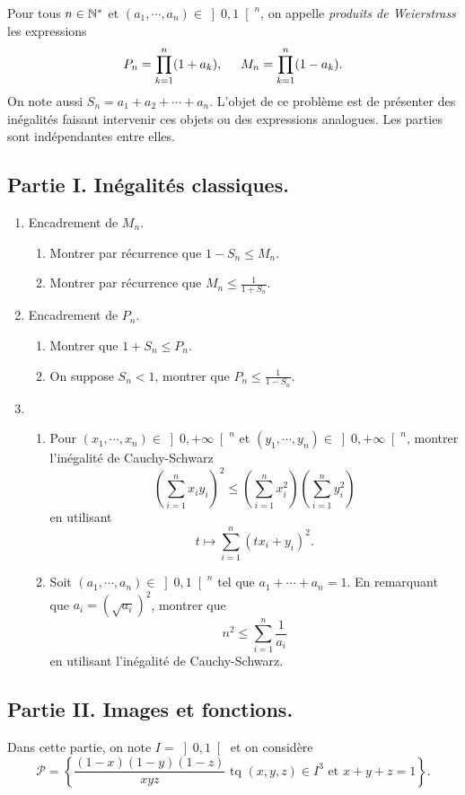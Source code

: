 Pour tous $n \in \mathbb{N}^*$ et $(a_1,\cdots,a_n)\in \left] 0, 1\right[^n$, on appelle \emph{produits de Weierstrass} les expressions 
\[
 P_n = \prod_{k=1}^{n}(1 + a_k), \hspace{0.5cm} M_n = \prod_{k=1}^{n}(1 - a_k). 
\]
On note aussi $S_n = a_1 + a_2 + \cdots + a_n$. \newline
L'objet de ce problème est de présenter des inégalités faisant intervenir ces objets ou des expressions analogues. Les parties sont indépendantes entre elles.
\subsection*{Partie I. Inégalités classiques.}
\begin{enumerate}
\item Encadrement de $M_n$.
\begin{enumerate}
 \item Montrer par récurrence que $1 - S_n \leq M_n$.
 \item Montrer par récurrence que $M_n \leq \frac{1}{1 + S_n}$.
\end{enumerate}
\item Encadrement de $P_n$.
\begin{enumerate}
 \item Montrer que $1 + S_n \leq P_n$.
 \item On suppose $S_n < 1$, montrer que $P_n \leq \frac{1}{1 - S_n}$.
\end{enumerate}
\item 
\begin{enumerate}
 \item Pour $(x_1,\cdots,x_n)\in \left]0, + \infty\right[^n$ et $(y_1,\cdots,y_n)\in \left]0, + \infty\right[^n$, montrer l'inégalité de Cauchy-Schwarz
\[
 \left( \sum_{i=1}^n x_i y_i\right)^2 \leq \left( \sum_{i=1}^n x_i^2\right)  \left( \sum_{i=1}^n y_i^2\right)
\]
en utilisant 
\[
 t \mapsto \sum_{i=1}^n (t x_i + y_i)^2.
\]
 \item Soit $(a_1,\cdots,a_n)\in \left] 0, 1\right[^n$ tel que $a_1+\cdots + a_n=1$. En remarquant que $a_i = (\sqrt{a_i})^2$, montrer que 
\[
 n^2 \leq \sum_{i=1}^n \frac{1}{a_i}
\]
en utilisant l'inégalité de Cauchy-Schwarz.
\end{enumerate}


\end{enumerate}

\subsection*{Partie II. Images et fonctions.}
Dans cette partie, on note $I = \left] 0,1 \right[$ et on considère
\[
 \mathcal{P} = \left\lbrace \frac{(1-x)(1-y)(1-z)}{xyz} \text{ tq } (x,y,z)\in I^3 \text{ et } x + y + z =1\right\rbrace.
\]

